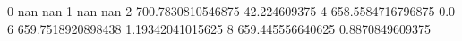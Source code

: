 0 nan nan
1 nan nan
2 700.7830810546875 42.224609375
4 658.5584716796875 0.0
6 659.7518920898438 1.19342041015625
8 659.445556640625 0.8870849609375
